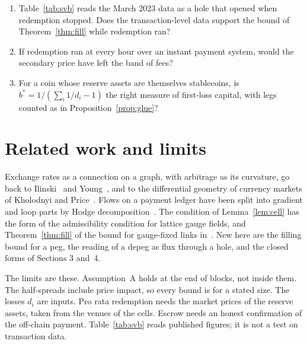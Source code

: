 \documentclass[11pt]{article}
\theoremstyle{definition}
\theoremstyle{remark}
\begin{document}
\begin{enumerate}[label=\textup{Q\arabic*.},leftmargin=3em]
\item Table~\ref{tab:svb} reads the March 2023 data as a hole that opened when redemption stopped. Does the transaction-level data support the bound of Theorem~\ref{thm:fill} while redemption ran?
\item If redemption ran at every hour over an instant payment system, would the secondary price have left the band of fees?
\item For a coin whose reserve assets are themselves stablecoins, is $b^*=1/(\sum_i1/d_i-1)$ the right measure of first-loss capital, with legs counted as in Proposition~\ref{prop:glue}?
\end{enumerate}

\section{Related work and limits}

Exchange rates as a connection on a graph, with arbitrage as its curvature, go back to Ilinski~\cite{Il} and Young~\cite{Yo}, and to the differential geometry of currency markets of Kholodnyi and Price~\cite{KP}. Flows on a payment ledger have been split into gradient and loop parts by Hodge decomposition~\cite{XRP}. The condition of Lemma~\ref{lem:cell} has the form of the admissibility condition for lattice gauge fields, and Theorem~\ref{thm:fill} of the bound for gauge-fixed links in~\cite{Wi}. New here are the filling bound for a peg, the reading of a depeg as flux through a hole, and the closed forms of Sections 3 and~4.

The limits are these. Assumption~A holds at the end of blocks, not inside them. The half-spreads include price impact, so every bound is for a stated size. The losses $d_i$ are inputs. Pro rata redemption needs the market prices of the reserve assets, taken from the venues of the cells. Escrow needs an honest confirmation of the off-chain payment. Table~\ref{tab:svb} reads published figures; it is not a test on transaction data.
\end{document}
